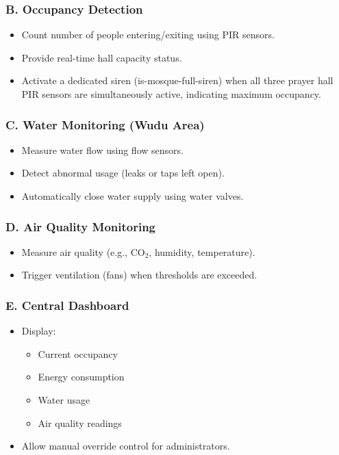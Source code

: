 \subsubsection*{B. Occupancy Detection}
\begin{itemize}
  \item Count number of people entering/exiting using PIR sensors.
  \item Provide real-time hall capacity status.
  \item Activate a dedicated siren (is-mosque-full-siren) when all three prayer hall PIR sensors are simultaneously active, indicating maximum occupancy.
\end{itemize}

\subsubsection*{C. Water Monitoring (Wudu Area)}
\begin{itemize}
  \item Measure water flow using flow sensors.
  \item Detect abnormal usage (leaks or taps left open).
  \item Automatically close water supply using water valves.
\end{itemize}

\subsubsection*{D. Air Quality Monitoring}
\begin{itemize}
  \item Measure air quality (e.g., CO$_2$, humidity, temperature).
  \item Trigger ventilation (fans) when thresholds are exceeded.
\end{itemize}

\subsubsection*{E. Central Dashboard}
\begin{itemize}
  \item Display:
  \begin{itemize}
    \item Current occupancy
    \item Energy consumption
    \item Water usage
    \item Air quality readings
  \end{itemize}
  \item Allow manual override control for administrators.
\end{itemize}

